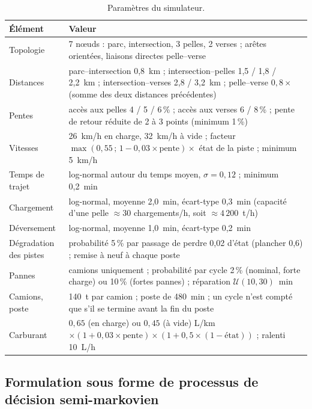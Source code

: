 \documentclass[11pt,a4paper]{article}
\newif\ifrevmarks
\newcommand{\revtag}[1]{\ifrevmarks\textsuperscript{\textcolor{red!70!black}{\scriptsize[#1]}}\fi}
\newcommand{\rev}[2]{\ifrevmarks{\color{revcolor}#2}\revtag{#1}\else#2\fi}
\begin{document}
\begin{table}[H]
\centering
\caption{\rev{M11}{Paramètres du simulateur.}}
\label{tab:simparams}
\footnotesize
\begin{tabularx}{\textwidth}{>{\raggedright\arraybackslash}p{3.6cm}X}
\toprule
\textbf{Élément} & \textbf{Valeur} \\
\midrule
Topologie & 7 nœuds : parc, intersection, 3 pelles, 2 verses ; arêtes orientées, liaisons directes pelle--verse \\
Distances & parc--intersection 0,8~km ; intersection--pelles 1,5 / 1,8 / 2,2~km ; intersection--verses 2,8 / 3,2~km ; pelle--verse $0{,}8\times$ (somme des deux distances précédentes) \\
Pentes & accès aux pelles 4 / 5 / 6\,\% ; accès aux verses 6 / 8\,\% ; pente de retour réduite de 2 à 3 points (minimum 1\,\%) \\
Vitesses & 26~km/h en charge, 32~km/h à vide ; facteur $\max(0{,}55\,;\,1-0{,}03\times\text{pente})\times$ état de la piste ; minimum 5~km/h \\
Temps de trajet & log-normal autour du temps moyen, $\sigma=0{,}12$ ; minimum 0,2~min \\
Chargement & log-normal, moyenne 2,0~min, écart-type 0,3~min (capacité d'une pelle $\approx 30$ chargements/h, soit $\approx 4\,200$~t/h) \\
Déversement & log-normal, moyenne 1,0~min, écart-type 0,2~min \\
Dégradation des pistes & probabilité 5\,\% par passage de perdre 0,02 d'état (plancher 0,6) ; remise à neuf à chaque poste \\
Pannes & camions uniquement ; probabilité par cycle 2\,\% (nominal, forte charge) ou 10\,\% (fortes pannes) ; réparation $\mathcal{U}(10,30)$~min \\
Camions, poste & 140~t par camion ; poste de 480~min ; un cycle n'est compté que s'il se termine avant la fin du poste \\
Carburant & $0{,}65$ (en charge) ou $0{,}45$ (à vide) L/km $\times(1+0{,}03\times\text{pente})\times(1+0{,}5\times(1-\text{état}))$ ; ralenti 10~L/h \\
\bottomrule
\end{tabularx}
\end{table}

\subsection{Formulation sous forme de processus de décision semi-markovien}
\label{sec:smdp}
\end{document}
